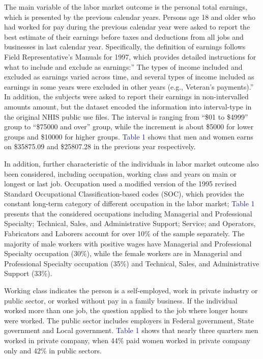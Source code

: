 \documentclass{article}
\begin{document}
\par
\setlength{\parindent}{2em}
The main variable of the labor market outcome is the personal total earnings, which is presented by the previous calendar years. Persons age 18 and older who had worked for pay during the previous calendar year were asked to report the best estimate of their earnings before taxes and deductions from all jobs and businesses in last calendar year. Specifically, the definition of earnings follows Field Representative's Manuals for 1997, which provides detailed instructions for what to include and exclude as earnings:” The types of income included and excluded as earnings varied across time, and several types of income included as earnings in some years were excluded in other years (e.g., Veteran's payments).” In addition, the subjects were asked to report their earnings in non-intervalled amounts amount, but the dataset encoded the information into interval-type in the original NHIS public use files. The interval is ranging from “\$01 to \$4999” group to “\$75000 and over” group, while the increment is about \$5000 for lower groups and \$10000 for higher groups. \textcolor{MidnightBlue}{Table 1} shows that men and women earns on \$35875.09 and \$25807.28 in the previous year respectively.
\par
\setlength{\parindent}{2em}
In addition, further characteristic of the individuals in labor market outcome also been considered, including occupation, working class and years on main or longest or last job. Occupation used a modified version of the 1995 revised Standard Occupational Classification-based codes (SOC), which provides the constant long-term category of different occupation in the labor market; \textcolor{MidnightBlue}{Table 1} presents that the considered occupations including Managerial and Professional Specialty; Technical, Sales, and Administrative Support; Service; and Operators, Fabricators and Laborers account for over 10\% of the sample separately. The majority of male workers with positive wages have Managerial and Professional Specialty occupation (30\%), while the female workers are in Managerial and Professional Specialty occupation (35\%) and Technical, Sales, and Administrative Support (33\%).

\par
\setlength{\parindent}{2em}
Working class indicates the person is a self-employed, work in private industry or public sector, or worked without pay in a family business. If the individual worked more than one job, the question applied to the job where longer hours were worked. The public sector includes employers in Federal government, State government and Local government. \textcolor{MidnightBlue}{Table 1} shows that nearly three quarters men worked in private company, when 44\% paid women worked in private company only and 42\% in public sectors.
\newpage
\end{document}
